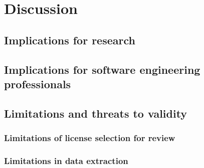 \chapter{Discussion\label{discussion}}
\section{Implications for research}
\section{Implications for software engineering professionals}
\section{Limitations and threats to validity}
\subsection{Limitations of license selection for review}
\subsection{Limitations in data extraction}
